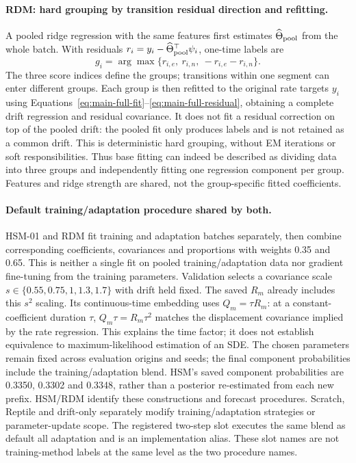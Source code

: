 \paragraph{RDM: hard grouping by transition residual direction and refitting.}
A pooled ridge regression with the same features first estimates
$\widehat\Theta_{\rm pool}$ from the whole batch. With residuals
$r_i=y_i-\widehat\Theta_{\rm pool}^{\top}\psi_i$, one-time labels are
\begin{equation}\label{eq:rdm-grouping}
 g_i=\arg\max\{r_{i,e},\ r_{i,n},\ -r_{i,e}-r_{i,n}\}.
\end{equation}
The three score indices define the groups; transitions within one segment
can enter different groups. Each group is then refitted to the original
rate targets $y_i$ using Equations~\eqref{eq:main-full-fit}--\eqref{eq:main-full-residual},
obtaining a complete drift regression and residual covariance. It does not
fit a residual correction on top of the pooled drift: the pooled fit only
produces labels and is not retained as a common drift. This is deterministic
hard grouping, without EM iterations or soft responsibilities. Thus base fitting
can indeed be described as dividing data into three groups and independently
fitting one regression component per group. Features and ridge strength are
shared, not the group-specific fitted coefficients.

\paragraph{Default training/adaptation procedure shared by both.}
HSM-01 and RDM fit training and adaptation batches separately, then combine
corresponding coefficients, covariances and proportions with weights 0.35 and 0.65.
This is neither a single fit on pooled training/adaptation data nor gradient
fine-tuning from the training parameters.
Validation selects a covariance scale $s\in\{0.55,0.75,1,1.3,1.7\}$ with
drift held fixed. The saved $R_m$ already includes this $s^2$ scaling.
Its continuous-time embedding uses $Q_m=\tau R_m$: at a constant-coefficient
duration $\tau$, $Q_m\tau=R_m\tau^2$ matches the displacement covariance
implied by the rate regression. This explains the time factor; it does
not establish equivalence to maximum-likelihood estimation of an SDE.
The chosen parameters remain fixed across evaluation origins and seeds;
the final component probabilities include the training/adaptation blend.
HSM's saved component probabilities are 0.3350, 0.3302 and 0.3348,
rather than a posterior re-estimated from each new prefix.
HSM/RDM identify these constructions and forecast procedures. Scratch,
Reptile and drift-only separately modify training/adaptation strategies or
parameter-update scope. The registered two-step slot executes the same blend
as default all adaptation and is an implementation alias. These slot names
are not training-method labels at the same level as the two procedure names.
